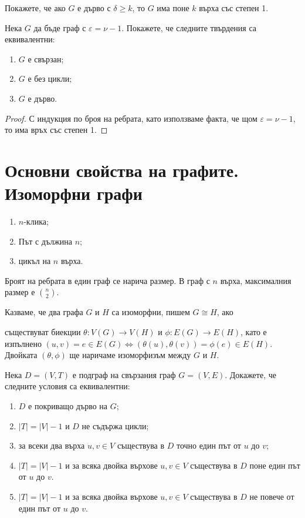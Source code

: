\begin{problem}
  Покажете, че ако $G$ е дърво с $\delta \geq k$, то $G$ има поне $k$ върха със степен 1.
\end{problem}

\begin{problem}
  Нека $G$ да бъде граф с $\varepsilon = \nu - 1$. Покажете, че следните твърдения са еквивалентни:
  \begin{enumerate}
  \item
    $G$ е свързан;
  \item
    $G$ е без цикли;
  \item
    $G$ е дърво.
\end{enumerate}
\end{problem}
\begin{proof}
  С индукция по броя на ребрата, като използваме факта, че щом $\varepsilon = \nu - 1$, то има
  връх със степен 1.
\end{proof}



\section{Основни свойства на графите. Изоморфни графи}
\begin{dfn}
  \begin{enumerate}
  \item
    $n$-клика;
  \item
    Път с дължина $n$;
  \item
    цикъл на $n$ върха.
\end{enumerate}
\end{dfn}

Броят на ребрата в един граф се нарича размер.
В граф с $n$ върха, максималния размер е $\binom{n}{2}$.

Казваме, че два графа $G$ и $H$ са изоморфни, пишем $G\cong H$, ако
\item съществуват биекции $\theta:V(G)\to V(H)$ и $\phi:E(G)\to E(H)$, като е изпълнено
$(u,v) = e \in E(G) \iff (\theta(u),\theta(v)) = \phi(e) \in E(H)$.
Двойката $(\theta,\phi)$ ще наричаме изоморфизъм между $G$ и $H$.



\begin{problem}
  Нека $D=(V,T)$ е подграф на свързания граф $G=(V,E)$.
  Докажете, че следните условия са еквивалентни:
  \begin{enumerate}
  \item
    $D$ е покриващо дърво на $G$;
  \item
    $|T| = |V|-1$ и $D$ не съдържа цикли;
  \item
    за всеки два върха $u,v\in V$ съществува в $D$ точно един път от $u$ до $v$;
  \item
    $|T| = |V|-1$ и за всяка двойка върхове $u,v\in V$ съществува в $D$ поне един път от $u$ до $v$.
  \item
    $|T| = |V|-1$ и за всяка двойка върхове $u,v\in V$ съществува в $D$ не повече от един път от $u$ до $v$.
  \end{enumerate}
\end{problem}

